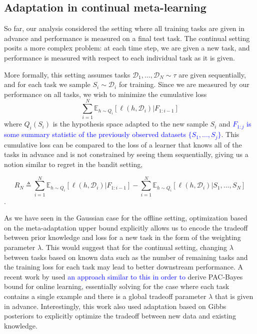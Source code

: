 \documentclass{article}
\theoremstyle{definition}
\newcommand{\Expect}[2]{\mathbb{E}_{#1}\left [#2 \right ]}
\newcommand{\LFe}[1]{\textcolor{blue}{#1}}
\begin{document}
\subsection{Adaptation in continual meta-learning}

So far, our analysis considered the setting where all training tasks are given in advance and performance is measured on a final test task. The continual setting posits a more complex problem: at each time step, we are given a new task, and performance is measured with respect to each individual task as it is given. 

More formally, this setting assumes tasks $\mathcal{D}_1,\ldots,\mathcal{D}_N\sim \tau$ are given sequentially, and for each task we sample $S_i\sim \mathcal{D}_i$ for training. Since we are measured by our performance on all tasks, we wish to minimize the cumulative loss
$$\sum_{i=1}^{N}\Expect{h\sim Q_i}{\ell(h, \mathcal{D}_i)| F_{1:i-1}}$$
where $Q_i(S_i)$ is the hypothesis space adapted to the new sample $S_i$ and \LFe{$F_{1:j}$ is some summary statistic of the previously observed datasets $\{S_1,...,S_j\}$}.
This cumulative loss can be compared to the loss of a learner that knows all of the tasks in advance and is not constrained by seeing them sequentially, giving us a notion similar to regret in the bandit setting,

$$R_N\triangleq \sum_{i=1}^{N}\Expect{h\sim Q_i}{\ell(h, \mathcal{D}_i)| F_{1:i-1}}-\sum_{i=1}^{N}\Expect{h\sim Q_i}{\ell(h,\mathcal{D}_i)|S_1,\ldots,S_N}$$.

As we have seen in the Gaussian case for the offline setting, optimization based on the meta-adaptation upper bound explicitly allows us to encode the tradeoff between prior knowledge and loss for a new 
task in the form of the weighting parameter $\lambda$.
This would suggest that for the continual setting, changing $\lambda$ between tasks based on known data such as the number of remaining tasks and the training loss for each task may lead to better downstream performance. 
A recent work by \citet{Haddouche2022} used \LFe{an approach similar to this in order to} derive PAC-Bayes bound for online learning, essentially solving for the case where each task contains a single example and there is a global tradeoff parameter $\lambda$ that is given in advance. Interestingly, this work also used adaptation based on Gibbs posteriors to explicitly optimize the tradeoff between new data and existing knowledge.
\end{document}
